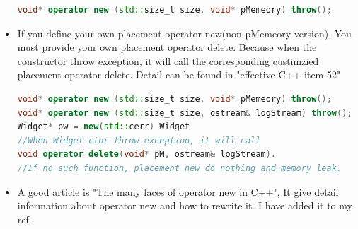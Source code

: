 \documentclass[a4paper,12pt,twoside]{book}
\begin{document}
\begin{itemize}
\begin{lstlisting}[frame=single, language=c++]
void* operator new (std::size_t size, void* pMemeory) throw();
\end{lstlisting}
	
	\item If you define your own placement operator new(non-pMemeory version). You must provide your own placement operator delete. Because when the constructor throw exception, it will call the corresponding custimzied placement operator delete. Detail can be found in "effective C++ item 52"
\begin{lstlisting}[frame=single, language=c++]
void* operator new (std::size_t size, void* pMemeory) throw();
void* operator new (std::size_t size, ostream& logStream) throw();
Widget* pw = new(std::cerr) Widget
//When Widget ctor throw exception, it will call 
void operator delete(void* pM, ostream& logStream). 
//If no such function, placement new do nothing and memory leak.
\end{lstlisting}
	
	\item A good article is "The many faces of operator new in C++", It give  detail information about operator new and how to rewrite it. I have added it to my ref.
\end{itemize}
\end{document}
